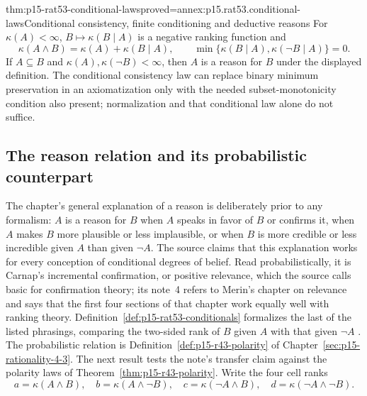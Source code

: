 \begin{hbtheorem}{thm:p15-rat53-conditional-laws}{proved=annex:p15.rat53.conditional-laws}{Conditional consistency, finite conditioning and deductive reasons}
For \(\kappa(A)<\infty\), \(B\mapsto\kappa(B\mid A)\) is a
negative ranking function and
\[
 \kappa(A\land B)=\kappa(A)+\kappa(B\mid A),\qquad
 \min\{\kappa(B\mid A),\kappa(\neg B\mid A)\}=0.
\]
If \(A\subseteq B\) and \(\kappa(A),\kappa(\neg B)<\infty\), then
\(A\) is a reason for \(B\) under the displayed definition.  The
conditional consistency law can replace binary minimum preservation in an
axiomatization only with the needed subset-monotonicity condition also present;
normalization and that conditional law alone do not suffice.
\end{hbtheorem}

\subsection{The reason relation and its probabilistic counterpart}
\label{sec:p15-w02b-p15-039-reasons}

The chapter's general explanation of a reason is deliberately prior to any
formalism: \(A\) is a reason for \(B\) when \(A\) speaks in favor of \(B\)
or confirms it, when \(A\) makes \(B\) more plausible or less implausible,
or when \(B\) is more credible or less incredible given \(A\) than given
\(\neg A\).  The source claims that this explanation works for every
conception of conditional degrees of belief.  Read probabilistically, it is
Carnap's incremental confirmation, or positive relevance, which the source
calls basic for confirmation theory; its note~4 refers to Merin's chapter on
relevance and says that the first four sections of that chapter work equally
well with ranking theory.  Definition~\ref{def:p15-rat53-conditionals}
formalizes the last of the listed phrasings, comparing the two-sided rank of
\(B\) given \(A\) with that given \(\neg A\)
\parencite[pp.~339--340 and p.~344, n.~4]{KernIsbernerSkovgaardOlsenSpohn2021Ranking}.
The probabilistic relation is
Definition~\ref{def:p15-r43-polarity} of Chapter~\ref{sec:p15-rationality-4-3}.
The next result tests the note's transfer claim against the polarity laws
of Theorem~\ref{thm:p15-r43-polarity}.  Write the four cell ranks
\[
 a=\kappa(A\land B),\quad b=\kappa(A\land\neg B),\quad
 c=\kappa(\neg A\land B),\quad d=\kappa(\neg A\land\neg B).
\]

